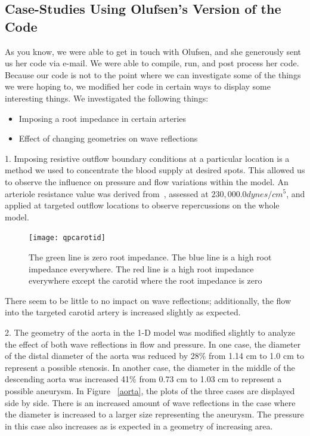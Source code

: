 \documentclass[12pt]{article}
\begin{document}
\pagebreak

\subsection{Case-Studies Using Olufsen's Version of the Code}
As you know, we were able to get in touch with Olufsen, and she generously sent us her code via e-mail. We were able to compile, run, and post process her code. Because our code is not to the point where we can investigate some of the things we were hoping to, we modified her code in certain ways to display some interesting things. We investigated the following things:

\begin{itemize}
	\item
		Imposing a root impedance in certain arteries
	\item
		Effect of changing geometries on wave reflections	
\end{itemize}

1. Imposing resistive outflow boundary conditions at a particular location is a method we used to concentrate the blood supply at desired spots. This allowed us to observe the influence on pressure and flow variations within the model. An arteriole resistance value was derived from~\cite{chung2012pressure}, assessed at $230,000.0 dynes/cm^5$, and applied at targeted outflow locations to observe repercussions on the whole model.

\begin{figure}
\centering
	\label{rootimpedance}
		\texttt{[image: qpcarotid]}
		\caption{The green line is zero root impedance. The blue line is a high root impedance everywhere. The red line is a high root impedance everywhere except the carotid where the root impedance is zero}
\end{figure}

There seem to be little to no impact on wave reflections; additionally, the flow into the targeted carotid artery is increased slightly as expected. 

2. The geometry of the aorta in the 1-D model was modified slightly to analyze the effect of both wave reflections in flow and pressure. In one case, the diameter of the distal diameter of the aorta was reduced by 28\% from 1.14 cm to 1.0 cm to represent a possible stenosis. In another case, the diameter in the middle of the  descending aorta was increased 41\% from 0.73 cm to 1.03 cm to represent a possible aneurysm. In Figure ~\ref{aorta}, the plots of the three cases are displayed side by side. There is an increased amount of wave reflections in the case where the diameter is increased to a larger size representing the aneurysm.  The pressure in this case also increases as is expected in a geometry of increasing area. 
\end{document}

